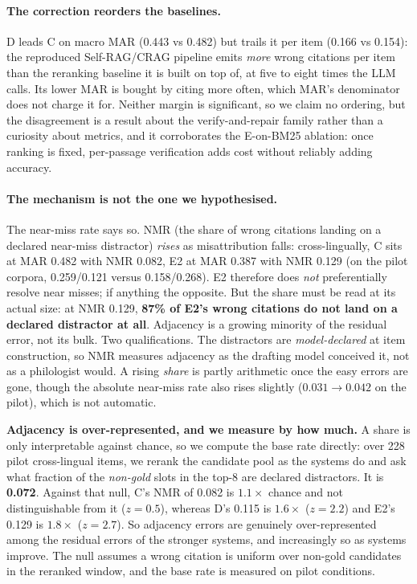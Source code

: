 \documentclass[11pt]{article}
\begin{document}
\paragraph{The correction reorders the baselines.} D leads C on macro MAR (0.443
vs 0.482) but trails it per item (0.166 vs 0.154): the reproduced Self-RAG/CRAG
pipeline emits \emph{more} wrong citations per item than the reranking baseline it
is built on top of, at five to eight times the LLM calls. Its lower MAR is bought
by citing more often, which MAR's denominator does not charge it for. Neither
margin is significant, so we claim no ordering, but the disagreement is a result
about the verify-and-repair family rather than a curiosity about metrics, and it
corroborates the E-on-BM25 ablation: once ranking is fixed, per-passage
verification adds cost without reliably adding accuracy.

\paragraph{The mechanism is not the one we hypothesised.} The near-miss rate says
so. NMR (the share of wrong citations landing on a declared near-miss
distractor) \emph{rises} as misattribution falls: cross-lingually, C sits at MAR
0.482 with NMR 0.082, E2 at MAR 0.387 with NMR 0.129 (on the pilot corpora,
0.259/0.121 versus 0.158/0.268). E2 therefore does \emph{not} preferentially resolve near misses; if anything the
opposite. But the share must be read at its actual size: at NMR 0.129,
\textbf{87\% of E2's wrong citations do not land on a declared distractor at
all}. Adjacency is a growing minority of the residual error, not its bulk.
Two qualifications. The distractors are
\emph{model-declared} at item construction, so NMR measures adjacency as the
drafting model conceived it, not as a philologist would. A rising
\emph{share} is partly arithmetic once the easy errors are gone, though the
absolute near-miss rate also rises slightly ($0.031 \to 0.042$ on the pilot),
which is not automatic.

\textbf{Adjacency is over-represented, and we measure by how much.} A share is
only interpretable against chance, so we compute the base rate directly: over 228 pilot cross-lingual items, we
rerank the candidate pool as the systems do and ask what fraction of the
\emph{non-gold} slots in the top-8 are declared distractors. It is
\textbf{0.072}. Against that null, C's NMR of 0.082 is $1.1\times$ chance and not
distinguishable from it ($z=0.5$), whereas D's 0.115 is $1.6\times$ ($z=2.2$) and
E2's 0.129 is $\mathbf{1.8\times}$ ($z=2.7$). So adjacency errors are genuinely
over-represented among the residual errors of the stronger systems, and
increasingly so as systems improve. The null assumes a wrong citation is uniform over non-gold candidates in the
reranked window, and the base rate is measured on pilot conditions.
\end{document}
